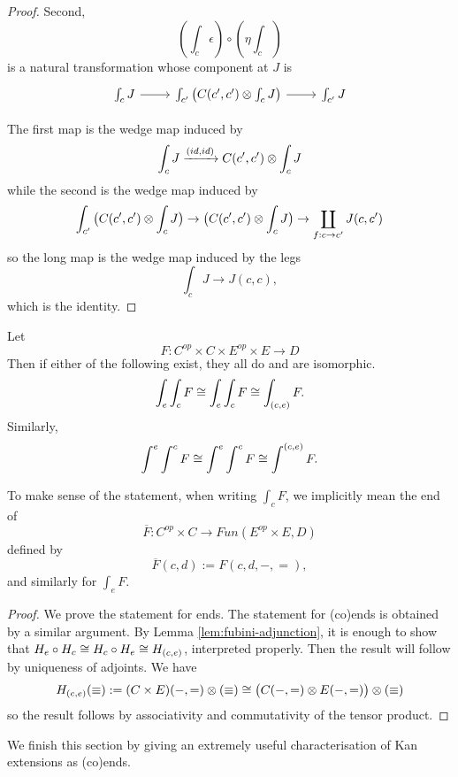 \begin{proof}
Second,
$$(\int_c \epsilon)\circ (\eta \int_c)$$ is a natural transformation whose component at $J$ is
\[\begin{tikzcd}
\int_c J \arrow[r] & {\int_{c'}\big(C(c',c')\tensor \int_cJ\big)} \arrow[r] & \int_{c'}J
\end{tikzcd}\]


The first map is the wedge map induced by $$\int_cJ\xrightarrow[]{(id,id)} C(c',c')\otimes \int_c J$$ while 
the second is the wedge map induced by $$\int_{c'}\big(C(c',c')\otimes \int_c J\big)\rightarrow \big(C(c',c')\otimes \int_c J\big)\rightarrow \coprod_{f:c\rightarrow c'}J(c,c')$$
so the long map is the wedge map induced by the legs $$\int_cJ \rightarrow J(c,c),$$ which is the identity.

\end{proof}
\begin{theorem}
    Let $$F:C^{op}\times C\times E^{op}\times E\rightarrow D$$ Then if either of the following exist, they all do and are isomorphic.
    $$\int_e\int_c F\cong \int_e\int_c F\cong \int_{(c,e)}F.$$
    Similarly,
    $$\int^e\int^c F\cong \int^e\int^c F\cong \int^{(c,e)}F.$$

\end{theorem}
To make sense of the statement, when writing $\int_c F$, we implicitly mean the end of $$\overline{F}:C^{op}\times C\rightarrow Fun(E^{op}\times E,D)$$ defined by $$\overline{F}(c,d):=F(c,d,-,=),$$
and similarly for $\int_e F$.
\begin{proof}
    We prove the statement for ends. The statement for (co)ends is obtained by a similar argument. By Lemma \autoref{lem:fubini-adjunction}, it is enough to show that $H_e\circ H_c\cong H_c\circ H_e\cong H_{(c,e)}$, interpreted properly. Then the result will follow by uniqueness of adjoints. We have
    $$H_{(c,e)}(\equiv):=(C\times E)(-,=)\otimes (\equiv)\cong \big(C(-,=)\otimes E(-,=)\big)\otimes (\equiv)$$
    so the result follows by associativity and commutativity of the tensor product.
\end{proof}

We finish this section by giving an extremely useful characterisation of Kan extensions as (co)ends.

